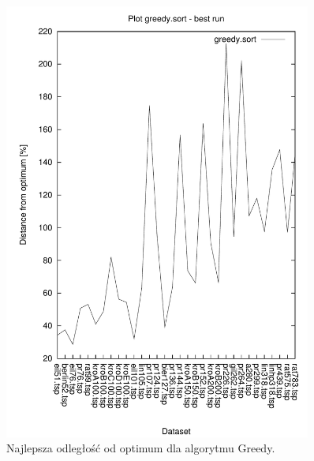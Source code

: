 \begin{figure}
\begin{center}
\includegraphics[width=0.9\textwidth]{wykresy/greedy_sort_best}
\end{center}
\caption{Najlepsza odległość od optimum dla algorytmu Greedy.}
\label{greedy_sort_best}
\end{figure}


